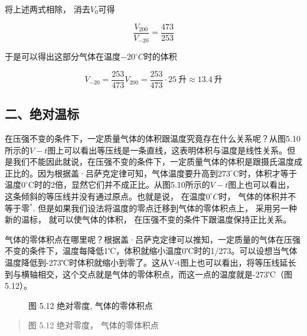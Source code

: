 将上述两式相除， 消去\(V_{0}\)可得

\[
\frac {V _ {200}}{V _ {- 20}} = \frac {473}{253}
\]

于是可以得出这部分气体在温度\(-20^{\circ}C\)时的体积

\[
V_{-20}=\frac{253}{473}V_{200}=\frac{253}{473}\cdot25\ \text{升}\approx13.4\ \text{升}
\]

\subsection{二、绝对温标}\label{ux4e8cux7eddux5bf9ux6e29ux6807}

在压强不变的条件下，一定质量气体的体积跟温度究竟存在什么关系呢？从图5.10所示的\(V - t\)图上可以看出等压线是一条直线，这表明体积与温度是线性关系。但是我们不能因此就说，在压强不变的条件下，一定质量气体的体积是跟摄氏温度成正比的。因为根据盖·吕萨克定律可知，气体温度要升高到\(273^{\circ}\mathrm{C}\)时，体积才等于温度\(0^{\circ}\mathrm{C}\)时的2倍，显然它们并不成正比。从图5.10所示的\(V - t\)图上也可以看出，这条倾斜的等压线并没有通过原点。也就是说，
在温度\(0^{\circ}C\)时， 气体的体积并不等于零\(^{*}\).
但是如果我们设法将温度的零点迁移到气体的零体积点上，
采用另一种新的温标， 就可以使气体的体积，
在压强不变的条件下跟温度保持正比关系。

气体的零体积点在哪里呢？根据盖·吕萨克定律可以推知，一定质量的气体在压强不变的条件下，温度每降低1℃，体积就缩小温度0℃时的1/273。可以设想当气体温度降低到-273℃时体积就缩小到零了。这从V-t图上也可以看出，将等压线延长到与横轴相交，这个交点就是气体的零体积点，而这一点的温度就是-273℃（图5.12）。

\begin{figure}
\centering
{}
\caption{图 5.12 绝对零度, 气体的零体积点}
\end{figure}

\begin{quote}
图 5.12 绝对零度， 气体的零体积点
\end{quote}

